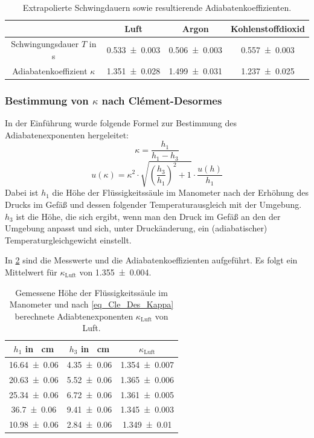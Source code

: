 \documentclass[
	a4paper,
	12pt,
	pagesize,
	ngerman
]{scrartcl}
\begin{document}
	\begin{table}[H]
		\centering
		\begin{tabular}{ c | c | c | c}
			&Luft & Argon  & Kohlenstoffdioxid\\ \hline
			Schwingungsdauer $T$ in s&\SI{0,533+-0,003}{}&\SI{0,506+-0,003}{} & \SI{0,557+-0,003}{}\\
			Adiabatenkoeffizient $\kappa$ &\SI{1,351+-0,028}{}&\SI{1,499+-0,031}{}&\SI{1,237+-0,025}{}\\
		\end{tabular}
		\caption{Extrapolierte Schwingdauern sowie resultierende Adiabatenkoeffizienten.}
		\label{tab_Rüc_Fla} 
	\end{table}
	
	
	
	\subsubsection{Bestimmung von $\kappa$ nach Clément-Desormes}
	In der Einführung wurde folgende Formel zur Bestimmung des Adiabatenexponenten hergeleitet:
	\begin{equation}
		\kappa = \frac{h_1}{h_1-h_3}
		\label{eq_Cle_Des_Kappa}
	\end{equation}
	\begin{equation}	
		u(\kappa) = \kappa^2\cdot \sqrt{\left(\frac{h_3}{h_1}\right)^2+1} \cdot \frac{u(h)}{h_1}
	\end{equation}
	Dabei ist $h_1$ die Höhe der Flüssigkeitssäule im Manometer nach der Erhöhung des Drucks im Gefäß und dessen folgender Temperaturausgleich mit der Umgebung. 
	$h_3$ ist die Höhe, die sich ergibt, wenn man den Druck im Gefäß an den der Umgebung anpasst und sich, unter Druckänderung, ein (adiabatischer) Temperaturgleichgewicht einstellt.
	
	In \cref{tab_Manometer} sind die Messwerte und die Adiabatenkoeffizienten aufgeführt. Es folgt ein Mittelwert für $\kappa_\text{Luft}$ von \SI{1,355+-0,004}{}.
	\begin{table}[H]
		\centering
		\begin{tabular}{ c | c | c }
			$h_1$ in \SI{}{cm} & $h_3$ in \SI{}{cm}  & $\kappa_\text{Luft}$\\ \hline
			\SI{16,64+-0,06}{}&\SI{4,35+-0,06}{} & \SI{1,354+-0,007}{}\\
			\SI{20,63+-0,06}{}&\SI{5,52+-0,06}{}& \SI{1,365+-0,006}{}\\
			\SI{25,34+-0,06}{}&\SI{6,72+-0,06}{}& \SI{1,361+-0,005}{}\\
			\SI{36,7+-0,06}{}&\SI{9,41+-0,06}{}& \SI{1,345+-0,003}{}\\
			\SI{10,98+-0,06}{}&\SI{2,84+-0,06}{}& \SI{1,349+-0,01}{}\\
		\end{tabular}
		\caption{Gemessene Höhe der Flüssigkeitssäule im Manometer und nach \cref{eq_Cle_Des_Kappa} berechnete Adiabtenexponenten $\kappa_\text{Luft}$ von Luft.}
		\label{tab_Manometer} 
	\end{table}
\end{document}
